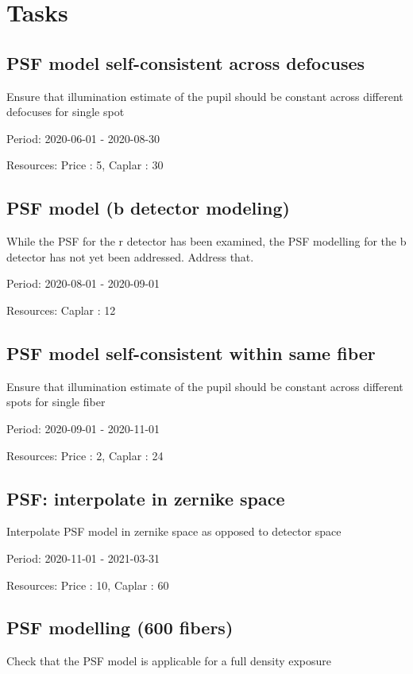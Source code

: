 \section{Tasks}\subsection{PSF model self-consistent across defocuses}

Ensure that illumination estimate of the pupil should be constant across different defocuses for single spot

Period: 2020-06-01 - 2020-08-30

Resources: Price : 5, Caplar : 30

\subsection{PSF model (b detector modeling)}

While the PSF for the r detector has been examined, the PSF modelling for the b detector has not yet been addressed. Address that.

Period: 2020-08-01 - 2020-09-01

Resources: Caplar : 12

\subsection{PSF model self-consistent within same fiber}

Ensure that illumination estimate of the pupil should be constant across different spots for single fiber

Period: 2020-09-01 - 2020-11-01

Resources: Price : 2, Caplar : 24

\subsection{PSF: interpolate in zernike space}

Interpolate PSF model in zernike space as opposed to detector space

Period: 2020-11-01 - 2021-03-31

Resources: Price : 10, Caplar : 60

\subsection{PSF modelling (600 fibers)}

Check that the PSF model is applicable for a full density exposure

